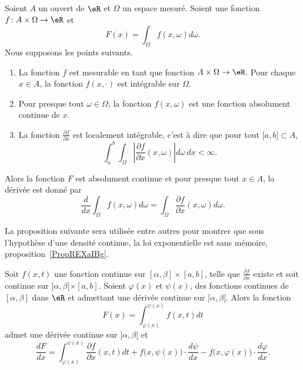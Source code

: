 \begin{theorem}     \label{ThoDerSousIntegrale}
    Soient \( A\) un ouvert de \( \eR\) et \( \Omega\) un espace mesuré. Soient une fonction \( f\colon A\times \Omega\to \eR\) et
    \begin{equation}
        F(x)=\int_{\Omega}f(x,\omega)d\omega.
    \end{equation}
    Nous supposons les points suivants.
    \begin{enumerate}
        \item
            La fonction \( f\) est mesurable en tant que fonction \( A\times\Omega\to \eR\). Pour chaque \( x\in A\), la fonction \( f(x,\cdot)\) est intégrable sur \( \Omega\).
        \item
            Pour presque tout \( \omega\in\Omega\), la fonction \( f(x,\omega)\) est une fonction absolument continue de \( x\).
        \item
            La fonction \( \frac{ \partial f }{ \partial x }\) est localement intégrable, c'est à dire que pour tout \( \mathopen[ a , b \mathclose]\subset A\),
            \begin{equation}
                \int_a^b\int_{\Omega}\left| \frac{ \partial f }{ \partial x }(x,\omega) \right| d\omega\,dx<\infty.
            \end{equation}
    \end{enumerate}
    Alors la fonction \( F\) est absolument continue et pour presque tout \( x\in A\), la dérivée est donné par
    \begin{equation}
        \frac{ d }{ dx }\int_{\Omega}f(x,\omega)d\omega=\int_{\Omega}\frac{ \partial f }{ \partial x }(x,\omega)d\omega.
    \end{equation}
\end{theorem}

La proposition suivante sera utilisée entre autres pour montrer que sous l'hypothèse d'une densité continue, la loi exponentielle est sans mémoire, proposition~\ref{PropREXaIBg}.
\begin{proposition}		\label{PropDerrFnAvecBornesFonctions}
Soit $f(x,t)$ une fonction continue sur $[\alpha,\beta]\times[a,b]$, telle que $\frac{ \partial f }{ \partial x }$ existe et soit continue sur $]\alpha,\beta[\times[a,b]$. Soient $\varphi(x)$ et $\psi(x)$, des fonctions continues de $[\alpha,\beta]$ dans $\eR$ et admettant une dérivée continue sur $]\alpha,\beta [$. Alors la fonction
\begin{equation}
	F(x)=\int_{\varphi(x)}^{\psi(x)}f(x,t)dt
\end{equation}
admet une dérivée continue sur $]\alpha,\beta[$ et
\begin{equation}	\label{EqFormDerrFnAvecBorneNInt}
	\frac{ dF }{ dx }=\int_{\varphi(x)}^{\psi(x)}\frac{ \partial f }{ \partial x }(x,t)dt+f\big( x,\psi(x) \big)\cdot\frac{ d\psi }{ dx }- f\big( x,\varphi(x) \big)\cdot\frac{ d\varphi }{ dx }.
\end{equation}
\end{proposition}

